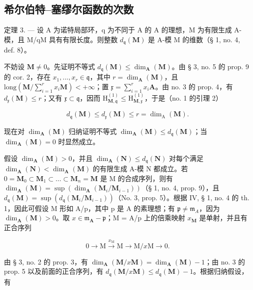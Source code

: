\subsection{希尔伯特–塞缪尔函数的次数}

定理 3. --- 设 A 为诺特局部环，q 为不同于 A 的 A 的理想，M 为有限生成 A-模，且 M/qM 具有有限长度。则整数 \(d_{\mathfrak{q}}(\mathbf{M})\) 是 A-模 M 的维数（§ 1, no. 4, def. 8）。

不妨设 \(\mathbf{M} \neq 0\)。先证明不等式 \(d_{\mathfrak{q}}(\mathbf{M}) \leqslant \dim_{\mathbf{A}}(\mathbf{M})\)。由 § 3, no. 5 的 prop. 9 的 cor. 2，存在 \(x_1, ..., x_r \in \mathfrak{q}\)，其中 \(r = \dim_{\mathbf{A}}(\mathbf{M})\)，且 \(\text{long}(\mathbf{M}/\sum_{i=1}^{r} x_i \mathbf{M}) < +\infty\)；置 \(\mathfrak{x} = \sum_{i=1}^{r} x_i \mathbf{A}\)。由 no. 3 的 prop. 4，有 \(d_{\mathfrak{x}}(\mathbf{M}) \leqslant r\)；又有 \(\mathfrak{x} \subset \mathfrak{q}\)，因而 \(\mathrm{H}_{\mathbf{M},\mathfrak{q}}^{(1)} \leqslant \mathrm{H}_{\mathbf{M},\mathfrak{x}}^{(1)}\)，于是（no. 1 的引理 2）

\[
d _ {\mathfrak{q}} (\mathbf {M}) \leqslant d _ {\mathfrak{x}} (\mathbf {M}) \leqslant r = \dim_ {\mathrm{A}} (\mathbf {M}).
\]

现在对 \(\dim_{\mathbf{A}}(\mathbf{M})\) 归纳证明不等式 \(\dim_{\mathbf{A}}(\mathbf{M}) \leqslant d_{\mathfrak{q}}(\mathbf{M})\)；当 \(\dim_{\mathbf{A}}(\mathbf{M}) = 0\) 时显然成立。

假设 \(\dim_{\mathbf{A}}(\mathbf{M}) > 0\)，并且 \(\dim_{\mathbf{A}}(\mathbf{N}) \leqslant d_{\mathfrak{q}}(\mathbf{N})\) 对每个满足 \(\dim_{\mathbf{A}}(\mathbf{N}) < \dim_{\mathbf{A}}(\mathbf{M})\) 的有限生成 A-模 N 都成立。若 \(0 = \mathbf{M}_0 \subset \mathbf{M}_1 \subset \ldots \subset \mathbf{M}_n = \mathbf{M}\) 是 M 的合成序列，则有 \(\dim_{\mathbf{A}}(\mathbf{M}) = \sup(\dim_{\mathbf{A}}(\mathbf{M}_i / \mathbf{M}_{i-1}))\)（§ 1, no. 4, prop. 9），且 \(d_{\mathfrak{q}}(\mathbf{M}) = \sup(d_{\mathfrak{q}}(\mathbf{M}_i / \mathbf{M}_{i-1}))\)（No. 3, prop. 5）。根据 IV, § 1, no. 4 的 th. 1，因此可假设 M 形如 A/p，其中 p 是 A 的素理想；有 \(\mathfrak{p} \ne \mathfrak{m}_{A}\)，因为 \(\dim_{\mathbf{A}}(\mathbf{M}) > 0\)。取 \(x \in \mathfrak{m}_{\mathbf{A}} - \mathfrak{p}\)；M = A/p 上的倍乘映射 \(x_{\mathbf{M}}\) 是单射，并且有正合序列

\[
0 \longrightarrow \mathrm{M} \xrightarrow {x _ {\mathrm{M}}} \mathrm{M} \longrightarrow \mathrm{M} / x \mathrm{M} \longrightarrow 0.
\]

由 § 3, no. 2 的 prop. 3，有 \(\dim_{\mathbf{A}}(\mathbf{M}/x\mathbf{M}) = \dim_{\mathbf{A}}(\mathbf{M}) - 1\)；由 no. 3 的 prop. 5 以及前面的正合序列，有 \(d_{\mathfrak{q}}(\mathbf{M}/x\mathbf{M}) \leqslant d_{\mathfrak{q}}(\mathbf{M}) - 1\)。根据归纳假设，有

